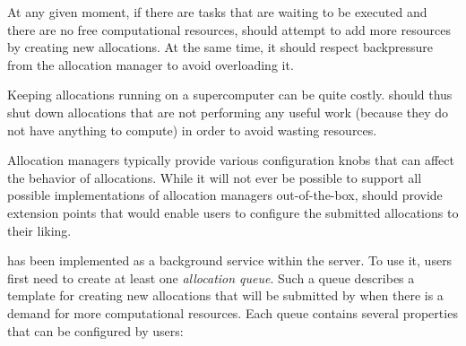 \begin{description}[wide=0pt,itemsep=0pt,topsep=2pt]
	\item[Allow computational resources to scale up] At any given moment, if there are tasks that are waiting to be executed and there are no free
		computational resources, \autoalloc{} should attempt to add more resources by creating
		new allocations. At the same time, it should respect backpressure from the allocation manager to
		avoid overloading it.
	\item[Allow computational resources to scale down] Keeping allocations running on a supercomputer can be quite costly. \Autoalloc{} should
		thus shut down allocations that are not performing any useful work (because they do not have
		anything to compute) in order to avoid wasting resources.
	\item[Be flexible] Allocation managers typically provide various configuration knobs that can affect the behavior of
		allocations. While it will not ever be possible to support all possible implementations of
		allocation managers out-of-the-box, \autoalloc{} should provide extension points that
		would enable users to configure the submitted allocations to their liking.
\end{description}

\Autoalloc{} has been implemented as a background service within the
\hyperqueue{} server. To use it, users first need to create at least one
\emph{allocation queue}. Such a queue describes a template for creating new allocations that will
be submitted by \hq{} when there is a demand for more computational resources.
Each queue contains several properties that can be configured by users:

